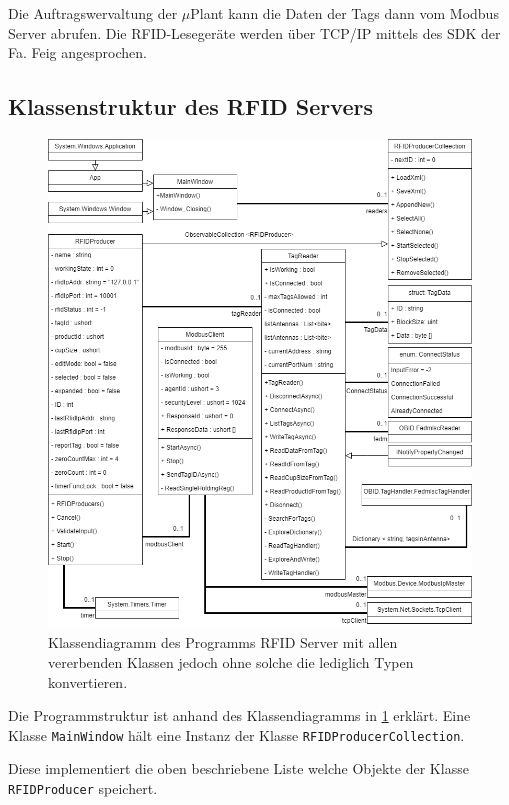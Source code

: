 Die Auftragswervaltung der $\mu$Plant kann die Daten der Tags dann vom Modbus Server abrufen.
Die RFID-Lesegeräte werden über TCP/IP mittels des SDK der Fa. Feig angesprochen.

\subsection{Klassenstruktur des RFID Servers}

\begin{figure}
    \caption[Klassendiagramm des Programms RFID Server ]
    {\small Klassendiagramm des Programms RFID Server mit allen vererbenden Klassen jedoch ohne solche die
    lediglich Typen konvertieren.}\label{fig:figure8}
    \includegraphics[width = \textwidth ]{Bilder/RFID_Klassendiagramm}
    \centering
\end{figure}

Die Programmstruktur ist anhand des Klassendiagramms in \ref{fig:figure8} erklärt.
Eine Klasse \verb|MainWindow| hält eine Instanz der Klasse \verb|RFIDProducerCollection|.

Diese implementiert die oben beschriebene Liste welche Objekte der Klasse \verb|RFIDProducer| speichert.

